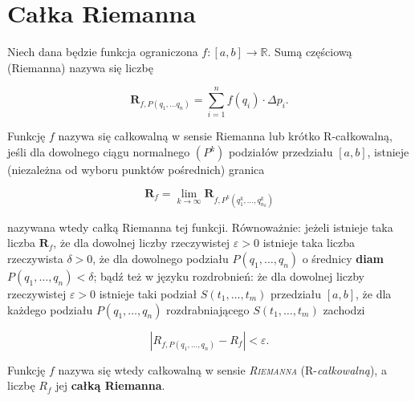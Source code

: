\documentclass[a4paper,11pt]{article}
\begin{document}
\section*{Całka Riemanna}

Niech dana będzie funkcja ograniczona $f \colon [a, b] \to \mathbb{R}$. Sumą częściową (Riemanna) nazywa się liczbę 

$$ \mathbf{R}_{f,P(q_1, \dots q_n)} = \sum^{n}_{i=1} f (q_i) \cdot \Delta p_i .$$

Funkcję $f$  nazywa się całkowalną w sensie Riemanna lub krótko R-całkowalną, jeśli dla dowolnego ciągu normalnego $(P^k)$ podziałów przedziału $[a,b]$, istnieje (niezależna od wyboru punktów pośrednich) granica 

$$ \mathbf{R}_f = \lim_{k \to \infty} \mathbf{R}_{f,P^k (q_1^k, \dots , q^k_{n_k})}$$

nazywana wtedy całką Riemanna tej funkcji. Równoważnie: jeżeli istnieje taka liczba $\mathbf{R}_f$, że dla dowolnej liczby rzeczywistej $\varepsilon > 0$ istnieje taka liczba rzeczywista $\delta >0 $, że dla dowolnego podziału $P (q_1, \dots , q_n)$ o średnicy \textbf{diam} $ P(q_1, \dots , q_n) < \delta$; bądź też w języku rozdrobnień: że dla dowolnej liczby rzeczywistej $\varepsilon > 0$ istnieje taki podział $S(t_{1},\dots ,t_{m})$ 
przedziału $[a,b]$, że dla każdego podziału $ P(q_{1},\dots ,q_{n})$ rozdrabniającego $ S(t_{1},\dots ,t_{m})$  zachodzi

$$\left| R_{{f,P(q_{1},\dots ,q_{n})}}-R_{f}\right|<\varepsilon .$$


Funkcję $f$ nazywa się wtedy całkowalną w sensie \textsc{\textit{Riemanna}}  (R-\textit{całkowalną}), a liczbę $R_{f}$ jej \textbf{całką Riemanna}.
\end{document}
